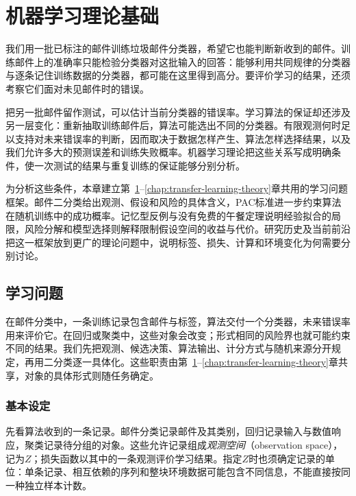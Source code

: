 \chapter{机器学习理论基础}
\label{chap:statistical-learning-framework}

我们用一批已标注的邮件训练垃圾邮件分类器，希望它也能判断新收到的邮件。训练邮件上的准确率只能检验分类器对这批输入的回答：能够利用共同规律的分类器与逐条记住训练数据的分类器，都可能在这里得到高分。要评价学习的结果，还须考察它们面对未见邮件时的错误。

把另一批邮件留作测试，可以估计当前分类器的错误率。学习算法的保证却还涉及另一层变化：重新抽取训练邮件后，算法可能选出不同的分类器。有限观测何时足以支持对未来错误率的判断，因而取决于数据怎样产生、算法怎样选择结果，以及我们允许多大的预测误差和训练失败概率。机器学习理论把这些关系写成明确条件，使一次测试的结果与重复训练的保证能够分别分析。

为分析这些条件，本章建立第~\ref{chap:statistical-learning-framework}--\ref{chap:transfer-learning-theory}章共用的学习问题框架。邮件二分类给出观测、假设和风险的具体含义，PAC标准进一步约束算法在随机训练中的成功概率。记忆型反例与没有免费的午餐定理说明经验拟合的局限，风险分解和模型选择则解释限制假设空间的收益与代价。研究历史及当前前沿把这一框架放到更广的理论问题中，说明标签、损失、计算和环境变化为何需要分别讨论。

\section{学习问题}
\label{sec:learning-problem}
\label{sec:statistical-learning-problem}

在邮件分类中，一条训练记录包含邮件与标签，算法交付一个分类器，未来错误率用来评价它。在回归或聚类中，这些对象会改变；形式相同的风险界也就可能约束不同的结果。我们先把观测、候选决策、算法输出、计分方式与随机来源分开规定，再用二分类逐一具体化。这些职责由第~\ref{chap:statistical-learning-framework}--\ref{chap:transfer-learning-theory}章共享，对象的具体形式则随任务确定。

\subsection{基本设定}

先看算法收到的一条记录。邮件分类记录邮件及其类别，回归记录输入与数值响应，聚类记录待分组的对象。这些允许记录组成\emph{观测空间}（observation space），记为$Z$；损失函数以其中的一条观测评价学习结果。指定$Z$时也须确定记录的单位：单条记录、相互依赖的序列和整块环境数据可能包含不同信息，不能直接按同一种独立样本计数。

